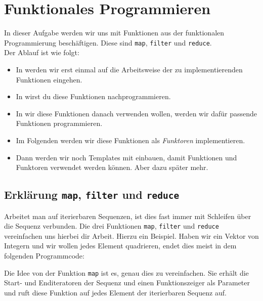 \section{Funktionales Programmieren}

In dieser Aufgabe werden wir uns mit Funktionen aus der funktionalen Programmierung beschäftigen.
Diese sind \lstinline{map}, \lstinline{filter} und \lstinline{reduce}. \\

Der Ablauf ist wie folgt:
\begin{itemize}
    \item In  werden wir erst einmal auf die Arbeitsweise der zu implementierenden Funktionen eingehen.
    \item In  wirst du diese Funktionen nachprogrammieren.
    \item In  wir diese Funktionen danach verwenden wollen, werden wir dafür passende Funktionen programmieren.
	\item Im Folgenden werden wir diese Funktionen als \emph{Funktoren} implementieren.
	\item Dann werden wir noch Templates mit einbauen, damit Funktionen und Funktoren verwendet werden können.
			Aber dazu später mehr.
\end{itemize}

\subsection{Erklärung \lstinline{map}, \lstinline{filter} und \lstinline{reduce}}\label{sec:map-filter-reduce-intro}

Arbeitet man auf iterierbaren Sequenzen, ist dies fast immer mit Schleifen über die Sequenz verbunden.
Die drei Funktionen \lstinline{map}, \lstinline{filter} und \lstinline{reduce} vereinfachen uns hierbei dir Arbeit.
Hierzu ein Beispiel.
Haben wir ein Vektor von Integern und wir wollen jedes Element quadrieren, endet dies meist in dem folgenden Programmcode:



Die Idee von der Funktion \lstinline{map} ist es, genau dies zu vereinfachen.
Sie erhält die Start- und Enditeratoren der Sequenz und einen Funktionszeiger als Parameter und ruft diese Funktion auf jedes Element der iterierbaren Sequenz auf.



